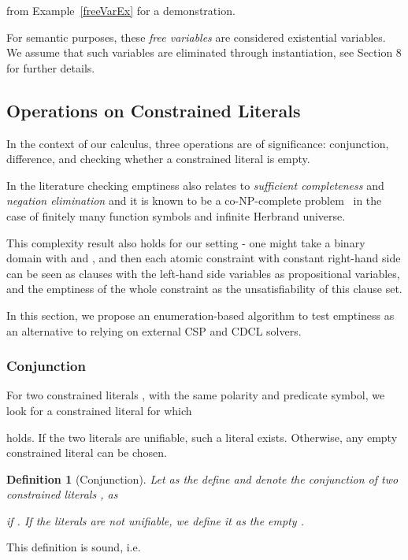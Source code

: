 \documentclass[a4paper]{article}
\newtheorem{defi}{Definition}[section]
\begin{document}
from Example~\ref{freeVarEx} for a demonstration.

For semantic purposes, these \emph{free variables} are considered existential variables.
We assume that such variables are eliminated through instantiation, see Section 8 for further details. 

\subsection{Operations on Constrained Literals}
In the context of our calculus, three operations are of significance: conjunction, difference, 
and checking whether a constrained literal is empty. 



In the literature checking emptiness also relates to \emph{sufficient completeness} and 
\emph{negation elimination}
and it is known to be a co-NP-complete problem~\cite{LassezM87} in the case of finitely many function symbols and infinite Herbrand universe.

This complexity result also holds for our setting - 
one might take a binary domain with  and , and then each atomic constraint with constant right-hand side 
can be seen as clauses with the left-hand side variables as propositional variables, 
and the emptiness of the whole constraint as the unsatisfiability of this clause set.

In this section, we propose an enumeration-based algorithm to test emptiness as an alternative
to relying on external CSP and CDCL solvers.

\subsubsection*{Conjunction}

For two constrained literals ,  with the same polarity and predicate symbol, we look for a constrained literal  for which

holds. If the two literals are unifiable,   
such a literal exists. Otherwise, any empty constrained literal can be chosen.

\begin{defi}[Conjunction] 
Let as the define and denote \emph{the conjunction of two constrained literals , } as

if . If the literals are not unifiable, we define it as the empty .
\end{defi}

\noindent
This definition is sound, i.e.\
\end{document}
